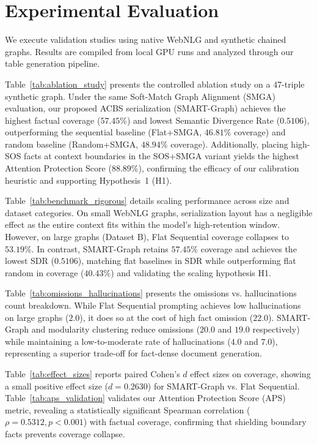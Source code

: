 \documentclass[conference]{IEEEtran}
\begin{document}
\section{Experimental Evaluation}
We execute validation studies using native WebNLG and synthetic chained graphs. Results are compiled from local GPU runs and analyzed through our table generation pipeline.



Table~\ref{tab:ablation_study} presents the controlled ablation study on a 47-triple synthetic graph. Under the same Soft-Match Graph Alignment (SMGA) evaluation, our proposed ACBS serialization (SMART-Graph) achieves the highest factual coverage ($57.45\%$) and lowest Semantic Divergence Rate ($0.5106$), outperforming the sequential baseline (Flat+SMGA, $46.81\%$ coverage) and random baseline (Random+SMGA, $48.94\%$ coverage). Additionally, placing high-SOS facts at context boundaries in the SOS+SMGA variant yields the highest Attention Protection Score ($88.89\%$), confirming the efficacy of our calibration heuristic and supporting Hypothesis~1 (H1).

Table~\ref{tab:benchmark_rigorous} details scaling performance across size and dataset categories. On small WebNLG graphs, serialization layout has a negligible effect as the entire context fits within the model's high-retention window. However, on large graphs (Dataset B), Flat Sequential coverage collapses to $53.19\%$. In contrast, SMART-Graph retains $57.45\%$ coverage and achieves the lowest SDR ($0.5106$), matching flat baselines in SDR while outperforming flat random in coverage ($40.43\%$) and validating the scaling hypothesis H1.

Table~\ref{tab:omissions_hallucinations} presents the omissions vs. hallucinations count breakdown. While Flat Sequential prompting achieves low hallucinations on large graphs ($2.0$), it does so at the cost of high fact omission ($22.0$). SMART-Graph and modularity clustering reduce omissions ($20.0$ and $19.0$ respectively) while maintaining a low-to-moderate rate of hallucinations ($4.0$ and $7.0$), representing a superior trade-off for fact-dense document generation.

Table~\ref{tab:effect_sizes} reports paired Cohen's $d$ effect sizes on coverage, showing a small positive effect size ($d = 0.2630$) for SMART-Graph vs. Flat Sequential. Table~\ref{tab:aps_validation} validates our Attention Protection Score (APS) metric, revealing a statistically significant Spearman correlation ($\rho = 0.5312, p < 0.001$) with factual coverage, confirming that shielding boundary facts prevents coverage collapse.
\end{document}
